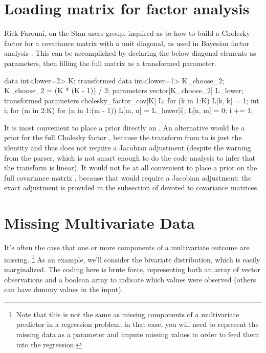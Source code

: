\section{Loading matrix for factor analysis}

Rick Farouni, on the Stan users group, inquired as to how to build
a Cholesky factor for a covariance matrix with a unit diagonal, as
used in Bayesian factor analysis \cite{aguilar-west:2000}.  This
can be accomplished by declaring the below-diagonal elements as
parameters, then filling the full matrix as a transformed parameter.
%
\begin{stancode}
data {
  int<lower=2> K;
}
transformed data {
  int<lower=1> K_choose_2;
  K_choose_2 = (K * (K - 1)) / 2;
}
parameters {
  vector[K_choose_2] L_lower;
}
transformed parameters {
  cholesky_factor_cov[K] L;
  for (k in 1:K)
    L[k, k] = 1;
  {
    int i;
    for (m in 2:K) {
      for (n in 1:(m - 1)) {
        L[m, n] = L_lower[i];
        L[n, m] = 0;
        i += 1;
      }
    }
  }
}
\end{stancode}
%
It is most convenient to place a prior directly on .
An alternative would be a prior for the full Cholesky factor ,
because the transform from  to  is just the
identity and thus does not require a Jacobian adjustment (despite the
warning from the parser, which is not smart enough to do the code
analysis to infer that the transform is linear).  It would not be at
all convenient to place a prior on the full covariance matrix , because that would require a Jacobian adjustment; the exact
adjustment is provided in the subsection of
 devoted to covariance matrices.

\section{Missing Multivariate Data}

It's often the case that one or more components of a multivariate
outcome are missing.%
%
\footnote{Note that this is not the same as missing components of a
  multivariate predictor in a regression problem;  in that case, you
  will need to represent the missing data as a parameter and impute
  missing values in order to feed them into the regression.}
%
As an example, we'll consider the bivariate distribution, which is
easily marginalized.  The coding here is brute force, representing
both an array of vector observations  and a boolean array
 to indicate which values were observed (others can
have dummy values in the input).

